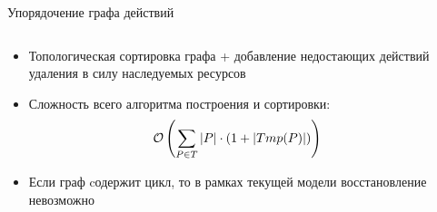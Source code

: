 \begin{frame}{Упорядочение графа действий}
\begin{columns}
\begin{column}{0.7\textwidth}
\begin{itemize}
   \item Топологическая сортировка графа + добавление недостающих действий удаления в силу наследуемых ресурсов
   \item Сложность всего алгоритма построения и сортировки: 
   	   \[\mathcal{O}\left(\sum_{P \in T}{|P|\cdot(1 + |Tmp(P)|)}\right)\]
   \item Если граф cодержит цикл, то в рамках текущей модели восстановление невозможно
\end{itemize}
\end{column}
\begin{column}{0.3\textwidth}  %
	\vspace{-0.4cm}
    \begin{center}

\end{center}
\end{column}
\end{columns}
\end{frame}
